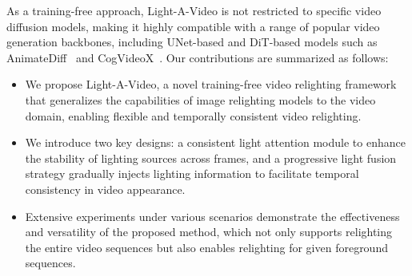 As a training-free approach, Light-A-Video is not restricted to specific video diffusion models,
making it highly compatible with a range of popular video generation backbones, 
including UNet-based and DiT-based models such as AnimateDiff~\citep{guo2023animatediff} and
CogVideoX~\citep{yang2024cogvideox}.
Our contributions are summarized as follows:
\begin{itemize}

\item We propose Light-A-Video, a novel training-free video relighting framework that
generalizes the capabilities of image relighting models to the video domain, enabling flexible and temporally consistent video relighting.


\item We introduce two key designs: a consistent light attention module to enhance the stability of lighting sources across frames,
and a progressive light fusion strategy gradually injects lighting information to facilitate temporal consistency in video appearance.

\item Extensive experiments under various scenarios demonstrate the effectiveness and versatility of the proposed method, which not only supports relighting the entire video sequences
but also enables relighting for given foreground sequences.

\end{itemize}
\vspace{-0.5em}